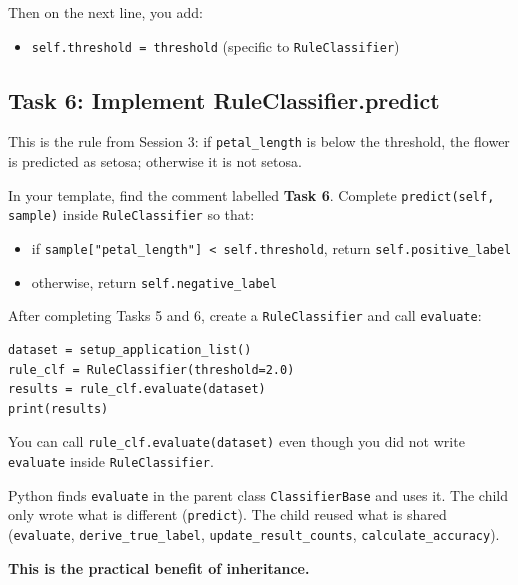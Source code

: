 \noindent
Then on the next line, you add:
\begin{itemize}
    \item \texttt{self.threshold = threshold} (specific to \texttt{RuleClassifier})
\end{itemize}

\subsection{Task 6: Implement RuleClassifier.predict}

\begin{tcolorbox}[title=Task 6: Implement RuleClassifier.predict]
This is the rule from Session 3: if \texttt{petal\_length} is below the threshold, the flower is predicted as setosa; otherwise it is not setosa.

\medskip
\noindent
In your template, find the comment labelled \textbf{Task 6}.
Complete \texttt{predict(self, sample)} inside \texttt{RuleClassifier} so that:
\begin{itemize}\setlength{\itemsep}{2pt}
    \item if \texttt{sample["petal\_length"] < self.threshold}, return \texttt{self.positive\_label}
    \item otherwise, return \texttt{self.negative\_label}
\end{itemize}
\end{tcolorbox}

\begin{tcolorbox}[title=Checkpoint: Inherited evaluate() Works]
After completing Tasks 5 and 6, create a \texttt{RuleClassifier} and call \texttt{evaluate}:
\begin{verbatim}
dataset = setup_application_list()
rule_clf = RuleClassifier(threshold=2.0)
results = rule_clf.evaluate(dataset)
print(results)
\end{verbatim}

\medskip
\noindent
You can call \texttt{rule\_clf.evaluate(dataset)} even though you did not write \texttt{evaluate} inside \texttt{RuleClassifier}.

\medskip
\noindent
Python finds \texttt{evaluate} in the parent class \texttt{ClassifierBase} and uses it.
The child only wrote what is different (\texttt{predict}).
The child reused what is shared (\texttt{evaluate}, \texttt{derive\_true\_label}, \texttt{update\_result\_counts}, \texttt{calculate\_accuracy}).

\medskip
\noindent
\textbf{This is the practical benefit of inheritance.}
\end{tcolorbox}

